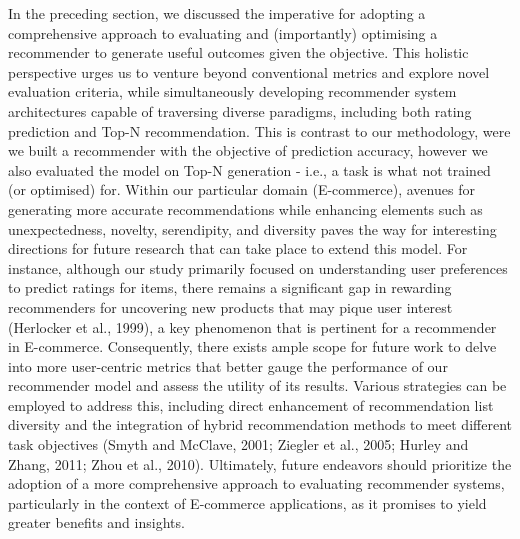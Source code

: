 In the preceding section, we discussed the imperative for adopting a comprehensive approach to evaluating and (importantly) optimising a recommender to generate useful outcomes given the objective. This holistic perspective urges us to venture beyond conventional metrics and explore novel evaluation criteria, while simultaneously developing recommender system architectures capable of traversing diverse paradigms, including both rating prediction and Top-N recommendation. This is contrast to our methodology, were we built a recommender with the objective of prediction accuracy, however we also evaluated the model on Top-N generation - i.e., a task is what not trained (or optimised) for. Within our particular domain (E-commerce), avenues for generating more accurate recommendations while enhancing elements such as unexpectedness, novelty, serendipity, and diversity paves the way for interesting directions for future research that can take place to extend this model. For instance, although our study primarily focused on understanding user preferences to predict ratings for items, there remains a significant gap in rewarding recommenders for uncovering new products that may pique user interest (Herlocker et al., 1999), a key phenomenon that is pertinent for a recommender in E-commerce. Consequently, there exists ample scope for future work to delve into more user-centric metrics that better gauge the performance of our recommender model and assess the utility of its results. Various strategies can be employed to address this, including direct enhancement of recommendation list diversity and the integration of hybrid recommendation methods to meet different task objectives (Smyth and McClave, 2001; Ziegler et al., 2005; Hurley and Zhang, 2011; Zhou et al., 2010). Ultimately, future endeavors should prioritize the adoption of a more comprehensive approach to evaluating recommender systems, particularly in the context of E-commerce applications, as it promises to yield greater benefits and insights.

